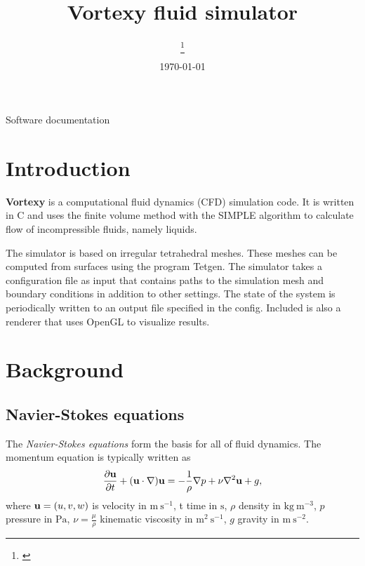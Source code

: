\documentclass[12pt]{article}
\title {
  Vortexy fluid simulator
}
\date{\today}
\author[1] {
  \firstauth\thanks{\href{mailto: \email}{\email}}
}
\newcommand{\un}[1]{ \text{#1}}
\newcommand{\up}[2]{\text{#1}^{#2}} %
\newcommand{\vb}[1]{\text{\textbf{#1}}}
\begin{document}
\setlength{\belowcaptionskip}{10pt}


\normalsize

\begin{titlingpage}
  \maketitle

  \begin{center}
    Software documentation
  \end{center}
\end{titlingpage}

\newpage

\tableofcontents

\newpage

\section{Introduction}

{\bf Vortexy} is a computational fluid dynamics (CFD) simulation code. It is written in C and uses the finite volume method with the SIMPLE algorithm to calculate flow of incompressible fluids, namely liquids.

The simulator is based on irregular tetrahedral meshes. These meshes can be computed from surfaces using the program Tetgen. The simulator takes a configuration file as input that contains paths to the simulation mesh and boundary conditions in addition to other settings. The state of the system is periodically written to an output file specified in the config. Included is also a renderer that uses OpenGL to visualize results.

\section{Background}

\subsection{Navier-Stokes equations}

The \textit{Navier-Stokes equations} form the basis for all of fluid dynamics. The momentum equation is typically written as \cite[p.~59]{tri}
\begin{equation}
  \frac{\partial \vb u}{\partial t} + (\vb u \cdot \nabla) \vb u = -\frac{1}{\rho} \nabla p + \nu \nabla^2 \vb u + g,
\end{equation}
where $\vb u = (u, v, w)$ is velocity in $\un{m} \ \up{s}{-1}$, t time in $\un{s}$, $\rho$ density in $\un{kg} \ \up{m}{-3}$, $p$ pressure in $\un{Pa}$, $\nu=\frac{\mu}{\rho}$ kinematic viscosity in $\up{m}{2} \ \up{s}{-1}$, $g$ gravity in $\un{m} \ \up{s}{-2}$.
\end{document}

